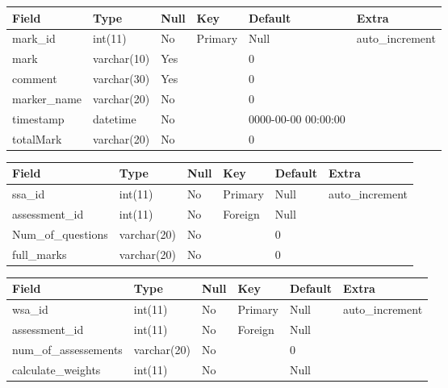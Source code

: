 \documentclass[12pt]{article}
\begin{document}
					\begin{tabular}{|p{1.0in}|p{1.0in}|p{0.4in}|p{0.4in}|p{1.0in}|p{1.1in}|} \hline
					Field & Type & Null & Key & Default & Extra \\ \hline
					mark\_id & int(11) & No & Primary & Null & auto\_increment \\ \hline
					mark & varchar(10) & Yes &  & 0 &  \\ \hline
					comment & varchar(30) & Yes &  & 0 &  \\ \hline
					marker\_name & varchar(20) & No &  & 0 &  \\ \hline
					timestamp & datetime & No &  & 0000-00-00 00:00:00 &  \\ \hline
					totalMark & varchar(20) & No &  & 0 &  \\ \hline
					\end{tabular}
					
					
					
					\begin{tabular}{|p{1.0in}|p{1.0in}|p{0.4in}|p{0.5in}|p{0.9in}|p{1.1in}|} \hline
					Field & Type & Null & Key & Default & Extra \\ \hline
					ssa\_id & int(11) & No & Primary & Null & auto\_increment \\ \hline
					assessment\_id & int(11) & No & Foreign & Null &  \\ \hline
					Num\_of\_questions & varchar(20) & No &  & 0 &  \\ \hline
					full\_marks & varchar(20) & No &  & 0 &  \\ \hline
					\end{tabular}
					
					
					
					\begin{tabular}{|p{1.0in}|p{0.9in}|p{0.4in}|p{0.6in}|p{0.9in}|p{1.1in}|} \hline
					Field & Type & Null & Key & Default & Extra \\ \hline
					wsa\_id & int(11) & No & Primary & Null & auto\_increment \\ \hline
					assessment\_id & int(11) & No & Foreign & Null &  \\ \hline
					num\_of\_assessements & varchar(20) & No &  & 0 &  \\ \hline
					calculate\_weights & int(11) & No &  & Null &  \\ \hline
					\end{tabular}
					
\end{document}
